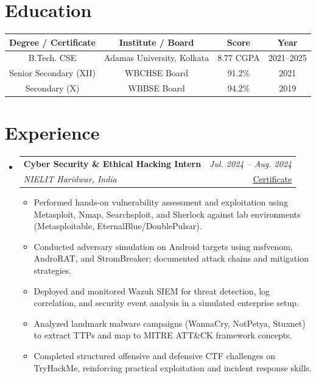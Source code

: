\documentclass[11pt,a4paper]{article}
\makeatletter
\newcommand{\resumeSubheading}[4]{
  \vspace{3pt}\item
  \begin{tabular*}{\textwidth}[t]{l@{\extracolsep{\fill}}r}
    \textbf{\normalsize #1} & \small\textit{#4} \\
    \small\textit{#3} & \small #2 \\
  \end{tabular*}
  \vspace{-2pt}
}
\newcommand{\resumeSubHeadingListStart}{\begin{itemize}[leftmargin=*,labelsep=0mm,itemsep=0pt]}
\newcommand{\resumeSubHeadingListEnd}{\end{itemize}\vspace{1mm}}
\newcommand{\resumeItemListStart}{%
  \begin{justify}
  \begin{itemize}[leftmargin=3.5ex, rightmargin=1ex, itemsep=0.5pt, labelsep=1.5mm]
  \small
}
\newcommand{\resumeItemListEnd}{\end{itemize}\end{justify}\vspace{-2mm}}
\makeatother
\begin{document}
\vspace{-1mm}

\section{Education}
\setlength{\tabcolsep}{5pt}
\renewcommand{\arraystretch}{1.15}
\small
\begin{tabularx}{\textwidth}{|c|C|c|c|}
  \hline
  \textbf{Degree / Certificate} & \textbf{Institute / Board} & \textbf{Score} & \textbf{Year} \\
  \hline
  B.Tech. CSE & Adamas University, Kolkata & 8.77 CGPA & 2021--2025 \\
  \hline
  Senior Secondary (XII) & WBCHSE Board & 91.2\% & 2021 \\
  \hline
  Secondary (X) & WBBSE Board & 94.2\% & 2019 \\
  \hline
\end{tabularx}

\section{Experience}
\resumeSubHeadingListStart
  \resumeSubheading
    {Cyber Security \& Ethical Hacking Intern}{\href{https://5pyd3r.is-a.dev/assets/certs/intern-2024.pdf}{\textcolor{accent}{Certificate}}}
    {NIELIT Haridwar, India}{Jul. 2024 -- Aug. 2024}
    \resumeItemListStart
      \item Performed hands-on vulnerability assessment and exploitation using Metasploit, Nmap, Searchsploit, and Sherlock against lab environments (Metasploitable, EternalBlue/DoublePulsar).
      \item Conducted adversary simulation on Android targets using msfvenom, AndroRAT, and StromBreaker; documented attack chains and mitigation strategies.
      \item Deployed and monitored Wazuh SIEM for threat detection, log correlation, and security event analysis in a simulated enterprise setup.
      \item Analyzed landmark malware campaigns (WannaCry, NotPetya, Stuxnet) to extract TTPs and map to MITRE ATT\&CK framework concepts.
      \item Completed structured offensive and defensive CTF challenges on TryHackMe, reinforcing practical exploitation and incident response skills.
    \resumeItemListEnd
\resumeSubHeadingListEnd
\vspace{-5mm}
\end{document}
